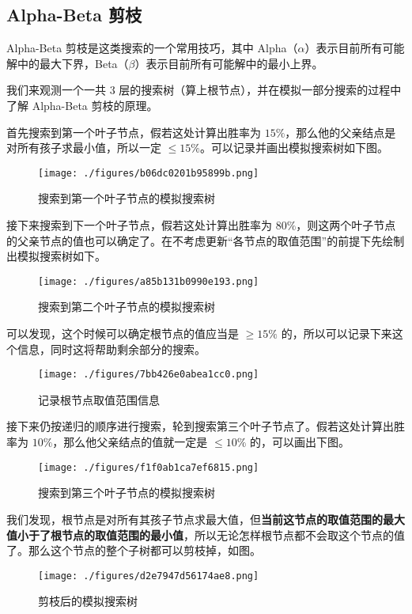 \subsection{Alpha-Beta 剪枝}
Alpha-Beta 剪枝是这类搜索的一个常用技巧，其中 Alpha（$\alpha$）表示目前所有可能解中的最大下界，Beta（$\beta$）表示目前所有可能解中的最小上界。

我们来观测一个一共 $3$ 层的搜索树（算上根节点），并在模拟一部分搜索的过程中了解 Alpha-Beta 剪枝的原理。

首先搜索到第一个叶子节点，假若这处计算出胜率为 $15\%$，那么他的父亲结点是对所有孩子求最小值，所以一定 $\le 15\%$。可以记录并画出模拟搜索树如下图。
\begin{figure}[ht]
\centering
\texttt{[image: ./figures/b06dc0201b95899b.png]}
\caption{搜索到第一个叶子节点的模拟搜索树} \label{fig_mmsab_15}
\end{figure}

接下来搜索到下一个叶子节点，假若这处计算出胜率为 $80\%$，则这两个叶子节点的父亲节点的值也可以确定了。在不考虑更新“各节点的取值范围”的前提下先绘制出模拟搜索树如下。
\begin{figure}[ht]
\centering
\texttt{[image: ./figures/a85b131b0990e193.png]}
\caption{搜索到第二个叶子节点的模拟搜索树} \label{fig_mmsab_16}
\end{figure}
可以发现，这个时候可以确定根节点的值应当是 $\ge 15\%$ 的，所以可以记录下来这个信息，同时这将帮助剩余部分的搜索。
\begin{figure}[ht]
\centering
\texttt{[image: ./figures/7bb426e0abea1cc0.png]}
\caption{记录根节点取值范围信息} \label{fig_mmsab_17}
\end{figure}

接下来仍按递归的顺序进行搜索，轮到搜索第三个叶子节点了。假若这处计算出胜率为 $10\%$，那么他父亲结点的值就一定是 $\le 10\%$ 的，可以画出下图。
\begin{figure}[ht]
\centering
\texttt{[image: ./figures/f1f0ab1ca7ef6815.png]}
\caption{搜索到第三个叶子节点的模拟搜索树} \label{fig_mmsab_18}
\end{figure}

我们发现，根节点是对所有其孩子节点求最大值，但\textbf{当前这节点的取值范围的最大值小于了根节点的取值范围的最小值}，所以无论怎样根节点都不会取这个节点的值了。那么这个节点的整个子树都可以剪枝掉，如图。
\begin{figure}[ht]
\centering
\texttt{[image: ./figures/d2e7947d56174ae8.png]}
\caption{剪枝后的模拟搜索树} \label{fig_mmsab_19}
\end{figure}

